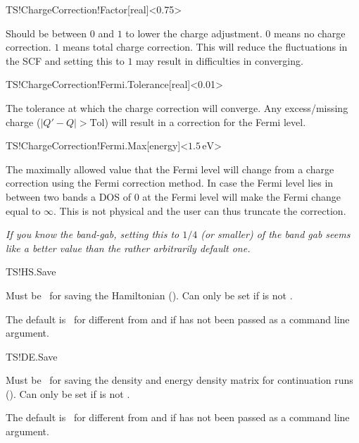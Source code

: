 \begin{fdfentry}{TS!ChargeCorrection!Factor}[real]<0.75>

  Should be between $0$ and $1$ to lower the charge adjustment. $0$
  means no charge correction. $1$ means total charge correction. This
  will reduce the fluctuations in the SCF and setting this to $1$ may
  result in difficulties in converging.
  
\end{fdfentry}

\begin{fdfentry}{TS!ChargeCorrection!Fermi.Tolerance}[real]<0.01>

  The tolerance at which the charge correction will converge. Any
  excess/missing charge ($|Q'-Q|>\mathrm{Tol}$) will result in a
  correction for the Fermi level.
  
\end{fdfentry}

\begin{fdfentry}{TS!ChargeCorrection!Fermi.Max}[energy]<$1.5\,\mathrm{eV}$>%

  The maximally allowed value that the Fermi level will change from a
  charge correction using the Fermi correction method. In case the
  Fermi level lies in between two bands a DOS of $0$ at the Fermi
  level will make the Fermi change equal to $\infty$. This is not
  physical and the user can thus truncate the correction.
  
  \emph{If you know the band-gab, setting this to $1/4$ (or smaller)
      of the band gab seems like a better value than the rather
      arbitrarily default one.}

\end{fdfentry}

\begin{fdflogicalT}{TS!HS.Save}

  Must be \fdftrue\ for saving the Hamiltonian (). Can only be set if
   is not .

  The default is \fdffalse\ for  different from
   and if  has not been passed as a
  command line argument.

\end{fdflogicalT}  

\begin{fdflogicalT}{TS!DE.Save}

  Must be \fdftrue\ for saving the density and energy density matrix
  for continuation runs (). Can only be set if
   is not .

  The default is \fdffalse\ for  different from
   and if  has not been passed as a
  command line argument.

\end{fdflogicalT}  

